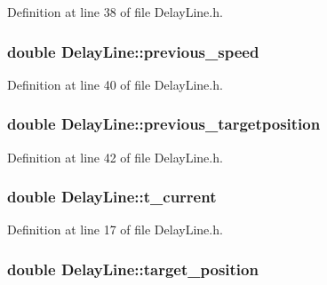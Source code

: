 Definition at line 38 of file DelayLine.h.

\hypertarget{classDelayLine_a0e814cb4b3e6fdfbbbf6157f02a938df}{
\subsubsection[{previous\_\-speed}]{\setlength{\rightskip}{0pt plus 5cm}double {\bf DelayLine::previous\_\-speed}}}
\label{classDelayLine_a0e814cb4b3e6fdfbbbf6157f02a938df}


Definition at line 40 of file DelayLine.h.

\hypertarget{classDelayLine_a1565f8501d8baba454f5d7743b90bf97}{
\subsubsection[{previous\_\-targetposition}]{\setlength{\rightskip}{0pt plus 5cm}double {\bf DelayLine::previous\_\-targetposition}}}
\label{classDelayLine_a1565f8501d8baba454f5d7743b90bf97}


Definition at line 42 of file DelayLine.h.

\hypertarget{classDelayLine_ae46cf8249f9040270c5ffb1289e5f760}{
\subsubsection[{t\_\-current}]{\setlength{\rightskip}{0pt plus 5cm}double {\bf DelayLine::t\_\-current}}}
\label{classDelayLine_ae46cf8249f9040270c5ffb1289e5f760}


Definition at line 17 of file DelayLine.h.

\hypertarget{classDelayLine_a27fb66446caf539997819c3600e5299e}{
\subsubsection[{target\_\-position}]{\setlength{\rightskip}{0pt plus 5cm}double {\bf DelayLine::target\_\-position}}}
\label{classDelayLine_a27fb66446caf539997819c3600e5299e}


